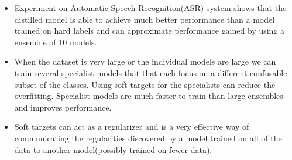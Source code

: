 \documentclass{article}
\begin{document}
\begin{itemize}
    \item Experiment on Automatic Speech Recognition(ASR) system shows that the distilled model is able to achieve much better performance than a model trained on hard labels and can approximate performance gained by using a ensemble of 10 models.
    \item When the dataset is very large or the individual models are large we can train several specialist models that that each focus on a different confusable subset of the classes. Using soft targets for the specialists can reduce the overfitting. Specialist models are much faster to train than large ensembles and improves performance.
    \item Soft targets can act as a regularizer and is a very effective way of communicating the regularities discovered by a model trained on all of the data to another model(possibly trained on fewer data).
\end{itemize}
\end{document}
